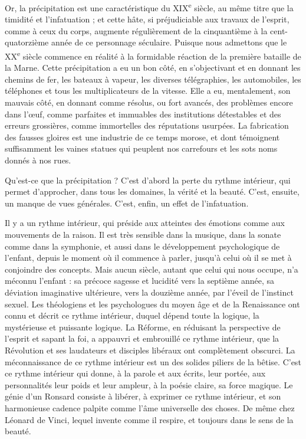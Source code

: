 \documentclass[french,twoside]{book} %
\begin{document}
Or, la précipitation est une caractéristique du XIX\textsuperscript{e} siècle, au même titre que la timidité et l’infatuation ; et cette hâte, si préjudiciable aux travaux de l’esprit, comme à ceux du corps, augmente régulièrement de la cinquantième à la cent-quatorzième année de ce personnage séculaire. Puisque nous admettons que le XX\textsuperscript{e} siècle commence en réalité à la formidable réaction de la première bataille de la Marne. Cette précipitation a eu un bon côté, en s’objectivant et en donnant les chemins de fer, les bateaux à vapeur, les diverses télégraphies, les automobiles, les téléphones et tous les multiplicateurs de la vitesse. Elle a eu, mentalement, son mauvais côté, en donnant comme résolus, ou fort avancés, des problèmes encore dans l’œuf, comme parfaites et immuables des institutions détestables et des erreurs grossières, comme immortelles des réputations usurpées. La fabrication des fausses gloires est une industrie de ce temps morose, et dont témoignent suffisamment les vaines statues qui peuplent nos carrefours et les sots noms donnés à nos rues.\par
Qu’est-ce que la précipitation ? C’est d’abord la perte du rythme intérieur, qui permet d’approcher, dans tous les domaines, la vérité et la beauté. C’est, ensuite, un manque de vues générales. C’est, enfin, un effet de l’infatuation.\par
Il y a un rythme intérieur, qui préside aux atteintes des émotions comme aux mouvements de la raison. Il est très sensible dans la musique, dans la sonate comme dans la symphonie, et aussi dans le développement psychologique de l’enfant, depuis le moment où il commence à parler, jusqu’à celui où il se met à conjoindre des concepts. Mais aucun siècle, autant que celui qui nous occupe, n’a méconnu l’enfant : sa précoce sagesse et lucidité vers la septième année, sa déviation imaginative ultérieure, vers la douzième année, par l’éveil de l’instinct sexuel. Les théologiens et les psychologues du moyen âge et de la Renaissance ont connu et décrit ce rythme intérieur, duquel dépend toute la logique, la mystérieuse et puissante logique. La Réforme, en réduisant la perspective de l’esprit et sapant la foi, a appauvri et embrouillé ce rythme intérieur, que la Révolution et ses laudateurs et disciples libéraux ont complètement obscurci. La méconnaissance de ce rythme intérieur est un des solides piliers de la bêtise. C’est ce rythme intérieur qui donne, à la parole et aux écrits, leur portée, aux personnalités leur poids et leur ampleur, à la poésie claire, sa force magique. Le génie d’un Ronsard consiste à libérer, à exprimer ce rythme intérieur, et son harmonieuse cadence palpite comme l’âme universelle des choses. De même chez Léonard de Vinci, lequel invente comme il respire, et toujours dans le sens de la beauté.\par
\end{document}
